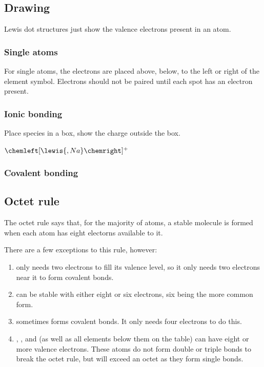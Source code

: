 \subsection{Drawing}
Lewis dot structures just show the valence electrons present in an atom.

\subsubsection{Single atoms}
For single atoms, the electrons are placed above, below, to the left or right of
the element symbol. Electrons should not be paired until each spot has an
electron present.


\subsubsection{Ionic bonding}
Place species in a box, show the charge outside the box.


$\chemleft[\lewis{,Na}\chemright]^{+}$

\subsubsection{Covalent bonding}

\subsection{Octet rule}
The octet rule says that, for the majority of atoms, a stable molecule is formed
when each atom has eight electorns available to it.

There are a few exceptions to this rule, however:
\begin{enumerate}
  \item {} only needs two electrons to fill its valence level, so it only
    needs two electrons near it to form covalent bonds.
  \item {} can be stable with either eight or six electrons, six being the
    more common form.
  \item {} sometimes forms covalent bonds. It only needs four electrons to
    do this.
  \item {}, , and  (as well as all elements below them on the
    table) can have eight or more valence electrons. These atoms do not form
    double or triple bonds to break the octet rule, but will exceed an octet as
    they form single bonds.
\end{enumerate}

